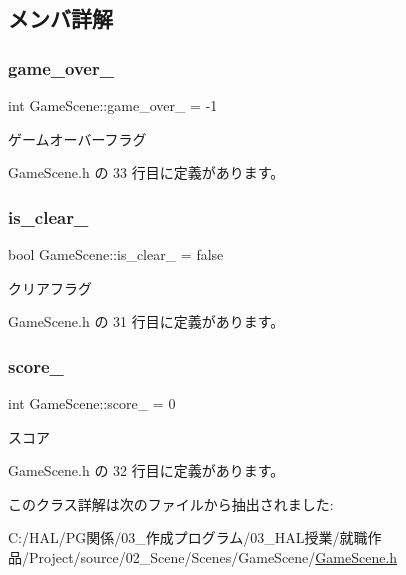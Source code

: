 \subsection{メンバ詳解}
\mbox{\label{class_game_scene_a92b5476dc1536c43b604bef51cc36c70}} 
\subsubsection{\texorpdfstring{game\+\_\+over\+\_\+}{game\_over\_}}
{\footnotesize\ttfamily int Game\+Scene\+::game\+\_\+over\+\_\+ = -\/1\hspace{0.3cm}{\ttfamily [private]}}



ゲームオーバーフラグ 



 Game\+Scene.\+h の 33 行目に定義があります。

\mbox{\label{class_game_scene_a48cf67b81c80718df80ee03aa6e73e74}} 
\subsubsection{\texorpdfstring{is\+\_\+clear\+\_\+}{is\_clear\_}}
{\footnotesize\ttfamily bool Game\+Scene\+::is\+\_\+clear\+\_\+ = false\hspace{0.3cm}{\ttfamily [private]}}



クリアフラグ 



 Game\+Scene.\+h の 31 行目に定義があります。

\mbox{\label{class_game_scene_afe49ee089b9ad8415f7ab432a3c554aa}} 
\subsubsection{\texorpdfstring{score\+\_\+}{score\_}}
{\footnotesize\ttfamily int Game\+Scene\+::score\+\_\+ = 0\hspace{0.3cm}{\ttfamily [private]}}



スコア 



 Game\+Scene.\+h の 32 行目に定義があります。



このクラス詳解は次のファイルから抽出されました\+:\begin{DoxyCompactItemize}
\item 
C\+:/\+H\+A\+L/\+P\+G関係/03\+\_\+作成プログラム/03\+\_\+\+H\+A\+L授業/就職作品/\+Project/source/02\+\_\+\+Scene/\+Scenes/\+Game\+Scene/\mbox{\hyperlink{_game_scene_8h}{Game\+Scene.\+h}}\end{DoxyCompactItemize}
